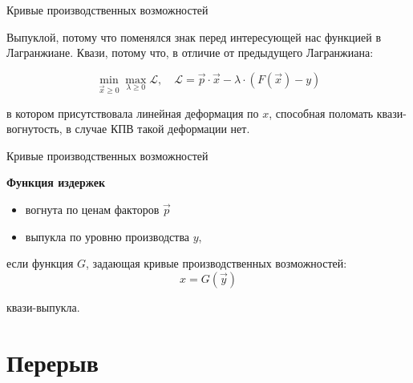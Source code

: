 \documentclass{beamer}
\begin{document}
\begin{frame}{Кривые производственных возможностей}

Выпуклой, потому что поменялся знак перед интересующей нас функцией в Лагранжиане. Квази, потому что, в отличие от предыдущего Лагранжиана:

$$ \min_{\vec x \geqslant 0} \max_{\lambda \geqslant 0} \mathcal{L}, \quad \mathcal{L} = \vec p \cdot \vec x - \lambda \cdot (F(\vec x) - y)$$

в котором присутствовала линейная деформация по $x$, способная поломать квази-вогнутость, в случае КПВ такой деформации нет.
\end{frame}

\begin{frame}{Кривые производственных возможностей}
\begin{lemma}
\textbf{Функция издержек}

\begin{itemize}
\item вогнута по ценам факторов $\vec p$
\item выпукла по уровню производства $y$,
\end{itemize}

если функция $G$, задающая кривые производственных возможностей:
$$x = G(\vec y)$$

квази-выпукла.
\end{lemma}
\end{frame}

\section{Перерыв}
\end{document}
